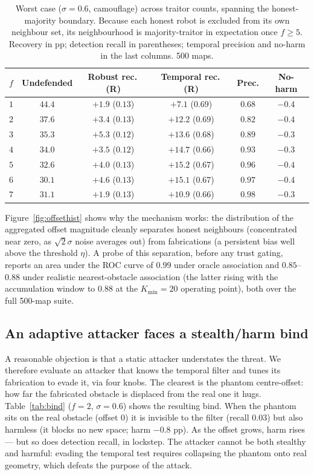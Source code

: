 \begin{table}[t]\centering
\caption{Worst case ($\sigma=0.6$, camouflage) across traitor counts,
spanning the honest-majority boundary. Because each honest robot is excluded
from its own neighbour set, its neighbourhood is majority-traitor in
expectation once $f\ge5$. Recovery in pp; detection recall in parentheses;
temporal precision and no-harm in the last columns. 500 maps.}
\label{tab:headline}
\begin{tabular}{lccccc}
\toprule
$f$ & Undefended & Robust rec.\,(R) & Temporal rec.\,(R) & Prec. & No-harm\\
\midrule
$1$ & $44.4$ & $+1.9$ ($0.13$) & $+7.1$ ($0.69$)  & $0.68$ & $-0.4$\\
$2$ & $37.6$ & $+3.4$ ($0.13$) & $+12.2$ ($0.69$) & $0.82$ & $-0.4$\\
$3$ & $35.3$ & $+5.3$ ($0.12$) & $+13.6$ ($0.68$) & $0.89$ & $-0.3$\\
$4$ & $34.0$ & $+3.5$ ($0.12$) & $+14.7$ ($0.66$) & $0.93$ & $-0.3$\\
$5$ & $32.6$ & $+4.0$ ($0.13$) & $+15.2$ ($0.67$) & $0.96$ & $-0.4$\\
$6$ & $30.1$ & $+4.6$ ($0.13$) & $+15.1$ ($0.67$) & $0.97$ & $-0.4$\\
$7$ & $31.1$ & $+1.9$ ($0.13$) & $\mathbf{+10.9}$ ($0.66$) & $0.98$ & $-0.3$\\
\bottomrule
\end{tabular}
\end{table}

Figure~\ref{fig:offsethist} shows why the mechanism works: the distribution
of the aggregated offset magnitude cleanly separates honest neighbours
(concentrated near zero, as $\sqrt{2}\sigma$ noise averages out) from
fabrications (a persistent bias well above the threshold $\eta$). A probe
of this separation, before any trust gating, reports an area under the ROC
curve of $0.99$ under oracle association and $0.85$--$0.88$ under realistic
nearest-obstacle association (the latter rising with the accumulation window
to $0.88$ at the $K_{\min}=20$ operating point), both over the full 500-map
suite.

\subsection{An adaptive attacker faces a stealth/harm bind}\label{sec:res-adaptive}
A reasonable objection is that a static attacker understates the threat. We
therefore evaluate an attacker that knows the temporal filter and tunes its
fabrication to evade it, via four knobs. The clearest is the phantom
centre-offset: how far the fabricated obstacle is displaced from the real
one it hugs. Table~\ref{tab:bind} ($f=2$, $\sigma=0.6$) shows the resulting
bind. When the phantom sits on the real obstacle (offset $0$) it is
invisible to the filter (recall $0.03$) but also harmless (it blocks no new
space; harm $-0.8$ pp). As the offset grows, harm rises --- but so does
detection recall, in lockstep. The attacker cannot be both stealthy and
harmful: evading the temporal test requires collapsing the phantom onto real
geometry, which defeats the purpose of the attack.

